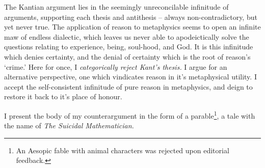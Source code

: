 \noindent
The Kantian argument lies in the seemingly unreconcilable infinitude of arguments, supporting each thesis and antithesis -- always non-contradictory, but yet never true. The application of reason to metaphysics seems to open an infinite maw of endless dialectic, which leaves us never able to apodeictically solve the questions relating to experience, being, soul-hood, and God. It is this infinitude which denies certainty, and the denial of certainty which is the root of reason's `crime.' Here for once, I \emph{categorically reject Kant's thesis.} I argue for an alternative perspective, one which vindicates reason in it's metaphysical utility. I accept the self-consistent infinitude of pure reason in metaphysics, and deign to restore it back to it's place of honour.

I present the body of my counterargument in the form of a parable\footnote{An Aesopic fable with animal characters was rejected upon editorial feedback.}, a tale with the name of \emph{The Suicidal Mathematician.}

